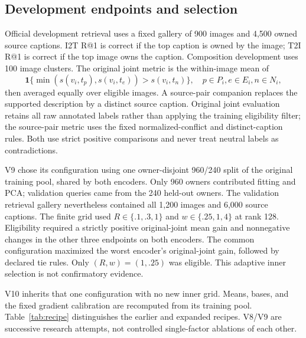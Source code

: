 \documentclass[11pt]{article}
\newcommand{\indicator}{\mathbf 1}
\begin{document}
\subsection{Development endpoints and selection}
Official development retrieval uses a fixed gallery of 900 images and
4,500 owned source captions. I2T R@1 is correct if the top caption is owned
by the image; T2I R@1 is correct if the top image owns the caption.
Composition development uses 100 image clusters. The original joint metric
is the within-image mean of
\begin{equation}
 \indicator\{\min(s(v_i,t_p),s(v_i,t_e))>s(v_i,t_n)\},
 \quad p\in P_i,e\in E_i,n\in N_i,
\end{equation}
then averaged equally over eligible images. A source-pair companion replaces
the supported description by a distinct source caption. Original joint
evaluation retains all raw annotated labels rather than applying the
training eligibility filter; the source-pair metric uses the fixed
normalized-conflict and distinct-caption rules. Both use strict positive
comparisons and never treat neutral labels as contradictions.

V9 chose its configuration using one owner-disjoint 960/240 split of the
original training pool, shared by both encoders. Only 960 owners contributed
fitting and PCA; validation queries came from the 240 held-out owners.
The validation retrieval gallery nevertheless contained all 1,200 images
and 6,000 source captions. The finite grid used $R\in\{.1,.3,1\}$ and
$w\in\{.25,1,4\}$ at rank 128. Eligibility required a strictly positive
original-joint mean gain and nonnegative changes in the other three
endpoints on both encoders. The common configuration maximized the worst
encoder's original-joint gain, followed by declared tie rules. Only
$(R,w)=(1,.25)$ was eligible. This adaptive inner selection is not
confirmatory evidence.

V10 inherits that one configuration with no new inner grid. Means, bases,
and the fixed gradient calibration are recomputed from its training pool.
Table~\ref{tab:recipe} distinguishes the earlier and expanded recipes.
V8/V9 are successive research attempts, not controlled single-factor
ablations of each other.
\end{document}
